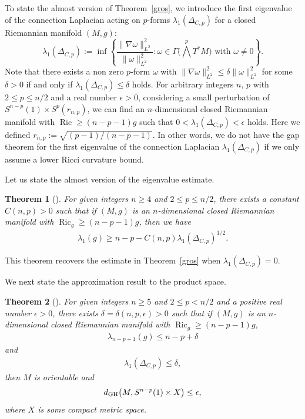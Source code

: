 \documentclass[pdftex]{sigma}
\numberwithin{equation}{section}
\newtheorem{Thm}{Theorem}[section]
\theoremstyle{definition}
\newcommand{\Ric}{\operatorname{Ric}}
\begin{document}
To state the almost version of Theorem~\ref{gros}, we introduce the first eigenvalue of the connection Laplacian acting on $p$-forms $\lambda_1(\Delta_{C,p})$ for a closed Riemannian manifold $(M,g)$:
\[
\lambda_1(\Delta_{C,p}):=\inf\left\{\frac{\|\nabla \omega\|_{L^2}^2}{\|\omega\|_{L^2}^2}\colon \omega\in\Gamma\Big(\bigwedge^p T^\ast M\Big) \text{ with }\omega\neq 0\right\} .
\]
Note that there exists a non zero $p$-form $\omega$ with $\|\nabla \omega\|_{L^2}^2\leq \delta\|\omega\|_{L^2}^2$ for some $\delta>0$ if and only if $\lambda_1(\Delta_{C,p})\leq \delta$ holds.
For arbitrary integers $n$, $p$ with $2\leq p\leq n/2$ and a real number $\epsilon>0$, considering a small perturbation of $S^{n-p}(1)\times S^p(r_{n,p})$, we can find an $n$-dimensional closed Riemannian manifold with $\Ric\geq (n-p-1) g$ such that $0<\lambda_1(\Delta_{C,p})<\epsilon$ holds. Here we defined $r_{n,p}:=\sqrt{(p-1)/(n-p-1)}$.
In other words, we do not have the gap theorem for the first eigenvalue of the connection Laplacian $\lambda_1(\Delta_{C,p})$ if we only assume a lower Ricci curvature bound.


Let us state the almost version of the eigenvalue estimate.
\begin{Thm}[\cite{Ai3}]
For given integers $n\geq 4$ and $2\leq p \leq n/2$, there exists a constant \mbox{$C(n,p)>0$} such that if $(M,g)$ is an $n$-dimensional closed Riemannian manifold with $\Ric_g\geq (n-p-1)g$,
then we have
\begin{gather*}
\lambda_1(g)\geq n-p-C(n,p)\lambda_1(\Delta_{C,p})^{1/2}.
\end{gather*}
\end{Thm}
This theorem recovers the estimate in Theorem~\ref{gros} when $\lambda_1(\Delta_{C,p})=0$.

We next state the approximation result to the product space.
\begin{Thm}[\cite{Ai3}]\label{prevm}
For given integers $n\geq 5$ and $2\leq p < n/2$ and a positive real number $\epsilon>0$, there exists $\delta=\delta(n,p,\epsilon)>0$ such that if $(M,g)$ is an $n$-dimensional closed Riemannian manifold with $\Ric_g\geq (n-p-1)g$,
\begin{gather*}
\lambda_{n-p+1}(g)\leq n-p+\delta
\end{gather*}
and
\begin{gather*}
\lambda_1(\Delta_{C,p})\leq \delta,
\end{gather*}
then $M$ is orientable and
\[
d_{{\rm GH}}\big(M,S^{n-p}(1)\times X\big)\leq \epsilon,
\]
where $X$ is some compact metric space.
\end{Thm}
\end{document}
